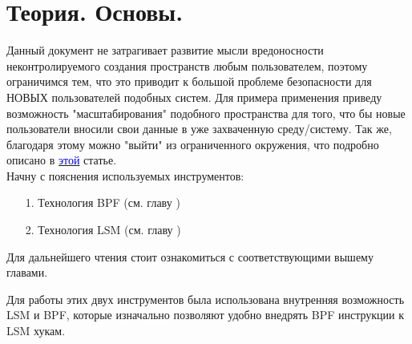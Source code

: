 \chapter{Теория. Основы.}
\label{theory-base-0}
\begin{flushleft}
	
Данный документ не затрагивает развитие мысли вредоносности неконтролируемого создания пространств любым пользователем, поэтому ограничимся тем, что это приводит к большой проблеме безопасности для НОВЫХ пользователей подобных систем. Для примера применения приведу возможность "масштабирования" подобного пространства для того, что бы новые пользователи вносили свои данные в уже захваченную среду/систему. Так же, благодаря этому можно "выйти" из ограниченного окружения, что подробно описано в  \href{https://book.hacktricks.xyz/linux-hardening/privilege-escalation/docker-security/namespaces/user-namespace}{\textcolor{blue}{этой}} статье. \\

Начну с пояснения используемых инструментов:
\begin{itemize}
	\item[1.] Технология BPF (см. главу \underline{})
	\item[2.] Технология LSM (см. главу \underline{})
\end{itemize}
Для дальнейшего чтения стоит ознакомиться с соответствующими вышему главами.

Для работы этих двух инструментов была использована внутренняя возможность LSM и BPF, которые изначально позволяют удобно внедрять BPF инструкции к LSM хукам.

\end{flushleft}